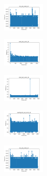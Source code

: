 \vspace*{\fill}
\newpage
\vspace*{\fill}

\begin{figure}[H]    
    \centering
    \begin{subfigure}
        \centering
        \includegraphics[width=0.234\textwidth]{img/am01mej/iris_set_const_10_949004259_time.png}
    \end{subfigure}
    \hfill
    \begin{subfigure}
        \centering
        \includegraphics[width=0.234\textwidth]{img/am01mej/ecoli_set_const_10_949004259_time.png}
    \end{subfigure}
    \hfill
    \begin{subfigure}
        \centering
        \includegraphics[width=0.234\textwidth]{img/am01mej/rand_set_const_10_949004259_time.png}
    \end{subfigure}
    \hfill
    \begin{subfigure}
        \centering
        \includegraphics[width=0.234\textwidth]{img/am01mej/newthyroid_set_const_10_949004259_time.png}
    \end{subfigure}
    \hfill
    \begin{subfigure}
        \centering
        \includegraphics[width=0.234\textwidth]{img/am01mej/iris_set_const_10_589741062_time.png}

\end{subfigure}
\end{figure}
